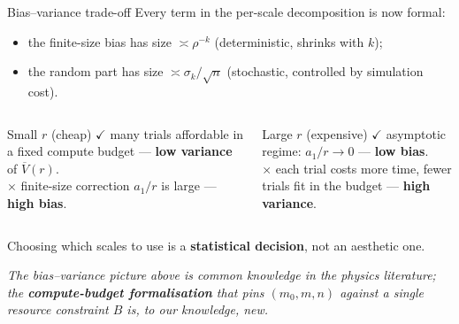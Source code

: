 \documentclass[10pt, aspectratio=169, xcolor={table}]{beamer}
\newcommand{\TODO}[1]{{\color{red}\textbf{[TODO]} #1}}
\renewcommand{\TODO}[1]{}
\begin{document}
\begin{frame}{Bias--variance trade-off}
  Every term in the per-scale decomposition is now formal:
  \begin{itemize}
    \item the finite-size bias has size $\asymp \rho^{-k}$
          (deterministic, shrinks with $k$);
    \item the random part has size $\asymp \sigma_k/\sqrt{n}$
          (stochastic, controlled by simulation cost).
  \end{itemize}

  \vspace{0.4em}
  \begin{columns}[t]
    \begin{column}{0.48\textwidth}
      \begin{alertblock}{Small $r$  (cheap)}
        $\checkmark$ many trials affordable in a fixed compute budget
        --- \textbf{low variance} of $\overline V(r)$.\\[0.4em]
        $\times$ finite-size correction $a_1 / r$ is large ---
        \textbf{high bias}.
      \end{alertblock}
    \end{column}
    \begin{column}{0.48\textwidth}
      \begin{exampleblock}{Large $r$  (expensive)}
        $\checkmark$ asymptotic regime: $a_1 / r \to 0$ ---
        \textbf{low bias}.\\[0.4em]
        $\times$ each trial costs more time, fewer trials fit in the
        budget --- \textbf{high variance}.
      \end{exampleblock}
    \end{column}
  \end{columns}

  \vspace{0.6em}
  \begin{center}
    \large
    Choosing which scales to use is a
    \textbf{statistical decision}, not an aesthetic one.
  \end{center}

  \vspace{0.4em}
  \begin{center}
    \footnotesize\itshape
    The bias--variance picture above is common knowledge in the physics
    literature; the \textbf{compute-budget formalisation} that pins
    $(m_0, m, n)$ against a single resource constraint $B$ is, to our
    knowledge, new.
  \end{center}

  \TODO{The estimator we will define drops the first $m_0$ scales
        (kills bias) and OLS-averages over a window of width $m$
        (controls variance). The whole point of Section 6 is: \textbf{how
        should $m_0$ scale with $m$ and with the compute budget?}}
\end{frame}
\end{document}
